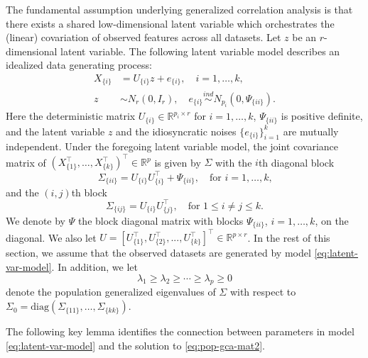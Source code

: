 \documentclass[11pt]{article}
\newcommand{\nb}[1]{\textcolor{orange}{\texttt{[#1]}}}
\newcommand{\dc}[1]{\{#1\}} %
\newcommand{\0}{{\mathbf{0}}}
\begin{document}
The fundamental assumption underlying generalized correlation analysis is that there exists a shared low-dimensional latent variable which orchestrates the (linear) covariation of observed features across all datasets.
Let $z$ be an $r$-dimensional latent variable. 
The following latent variable model describes an idealized data generating process:
\begin{equation}
      \label{eq:latent-var-model}
\begin{aligned}
      X_{\dc{i}} & = U_{ \dc{i}} z + e_{\dc{i}},\quad i=1,\dots,k,\\
      z   & \sim N_r(0, I_r),
      \quad
      e_{\dc{i}}  \stackrel{ind}{\sim} N_{p_i}(0, \Psi_{\dc{ii}}).
\end{aligned}
\end{equation}
Here the deterministic matrix $U_{\dc{i}}\in \mathbb{R}^{p_i\times r}$ for $i=1,\dots, k$, $\Psi_{\dc{ii}}$ 
is positive definite, and the latent variable $z$ and the idiosyncratic noises $\{e_{\dc{i}}\}_{i=1}^k$ are mutually independent.
Under the foregoing latent variable model, 
the joint covariance matrix of 
$({X_{\dc{1}}^\top} ,\dots, {X_{\dc{k}}^\top} )^\top \in \mathbb{R}^p$ is given by $\Sigma$ with the $i$th diagonal block
\begin{equation}
      \label{eq:Sigma-i}
      \Sigma_{\dc{ii}}=U_{\dc{i}}U_{\dc{i}}^\top +\Psi_{\dc{ii}},\quad \mbox{for $i=1,\dots,k$,}
\end{equation}
and the $(i,j)$th block
\begin{equation}
      \label{eq:Sigma-i-2}
    \Sigma_{\dc{ij}}={ U_{\dc{i}}}{U_{\dc{j}}^\top} ,\quad \mbox{for $1\leq i\neq j \leq k$}.
\end{equation}
We denote by $\Psi$ the block diagonal matrix with blocks ${\Psi_{\dc{ii}}}$, $i=1,\dots, k$, 
on the diagonal. 
We also let $U=[{ U_{\dc{1}}^\top}, { U_{\dc{2}}^\top} ,...,{ U_{\dc{k}}^\top}  ]^\top  \in \mathbb{R}^{p\times r}$.
In the rest of this section, 
we assume that the observed datasets are generated by model \eqref{eq:latent-var-model}.
In addition, we let 
\begin{equation}
      \label{eq:lambda-def}
\lambda_1\geq \lambda_2 \geq \cdots \geq \lambda_p\geq 0
\end{equation}
denote the population generalized eigenvalues of $\Sigma$ with respect to $\Sigma_0 = \mathrm{diag}(\Sigma_{\dc{11}},\dots,\Sigma_{\dc{kk}})$.


The following key lemma identifies the connection between parameters in model \eqref{eq:latent-var-model} and the solution to \eqref{eq:pop-gca-mat2}. 
\end{document}
